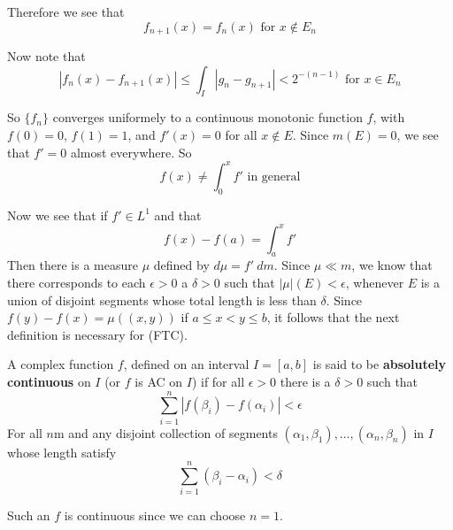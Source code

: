 \begin{enumerate}[label = (\alph*)]
Therefore we see that \[
    f_{n+1}(x) = f_n(x)  \text{ for }x\not\in E_n   
\]

Now note that \[
    |f_n(x) - f_{n+1}(x)|\leq \int_I |g_n-g_{n+1}|<2^{-(n-1)} \text{ for } x\in E_n    
\]

So $\{f_n\}$ converges uniformely to a continuous monotonic function $f$, with $f(0) = 0$, $f(1) = 1$, and $f'(x) = 0$ for all $x\not\in E$. Since $m(E) = 0$, we see that $f' = 0$ almost everywhere. So\[
    f(x) \neq \int_0^x f' \text{ in general}    
\]
\end{enumerate}

\begin{definition}\label{7.17}
    \begin{remark}
        Now we see that if $f'\in L^1$ and that \[
            f(x) - f(a) = \int_a^x f'   \tag{FTC}
        \]
        Then there is a measure $\mu$ defined by $d\mu = f'~dm$. Since $\mu \ll m$, we know that there corresponds to each $\epsilon>0$ a $\delta>0$ such that $|\mu|(E)<\epsilon$, whenever $E$ is a union of disjoint segments whose total length is less than $\delta$. Since $f(y) - f(x) = \mu((x,y))$ if $a\leq x<y\leq b$, it follows that the next definition is necessary for (FTC). 
    \end{remark}
    A complex function $f$, defined on an interval $I = [a,b]$ is said to be \textbf{absolutely continuous} on $I$ (or $f$ is AC on $I$) if for all $\epsilon>0$ there is a $\delta>0$ such that\[
        \sum_{i=1}^n|f(\beta_i)-f(\alpha_i)|<\epsilon    
    \]
    For all $n$m and any disjoint collection of segments $(\alpha_1,\beta_1),\ldots,(\alpha_n,\beta_n)$ in $I$ whose length satisfy\[
        \sum_{i=1}^n (\beta_i-\alpha_i)<\delta    
    \]
    \begin{remark}
        Such an $f$ is continuous since we can choose $n=1$.
    \end{remark}
\end{definition}

